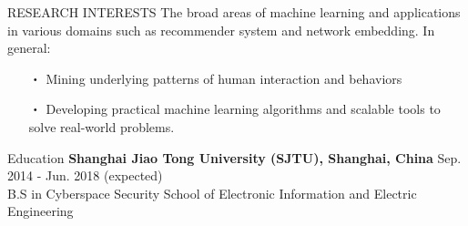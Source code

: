 \documentclass{resume} %
\begin{document}
\vspace{-1em}
\begin{rSection}{RESEARCH INTERESTS}
The broad areas of machine learning and applications in various domains such as recommender system and network embedding. In general:
\begin{itemize}[itemindent=-5mm] 
	\itemsep=-5pt
	\vspace*{-5pt}
	\item[・] Mining underlying patterns of human interaction and behaviors
	\item[・] Developing practical machine learning algorithms and scalable tools to solve real-world problems.
\end{itemize}
\end{rSection}


\begin{rSection}{Education}
\textbf{Shanghai Jiao Tong University (SJTU), Shanghai, China} \hfill Sep. 2014 - Jun. 2018 (expected)\\ %
B.S in Cyberspace Security \hfill School of Electronic Information and Electric Engineering 
\end{rSection}
\end{document}
